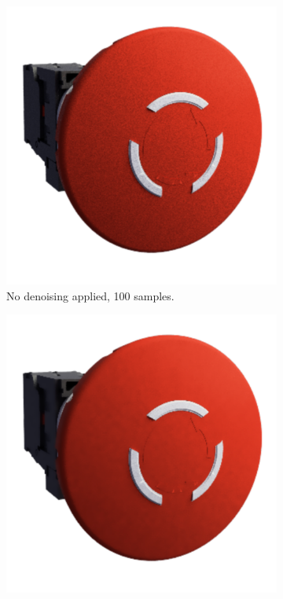 \begin{figure}[H]
    \centering
    \hspace*{0.8cm}
    \begin{subfigure}[t]{0.4\textwidth}
        \includegraphics[width=\textwidth]{resources/denoise-off-100-samples.png}
        \caption{No denoising applied, 100 samples.}
        \label{fig:denoise-off}
    \end{subfigure}
    \hfill
    \begin{subfigure}[t]{0.4\textwidth}
        \includegraphics[width=\textwidth]{resources/denoise-gaussian-100-samples.png}

\end{subfigure}
\end{figure}
